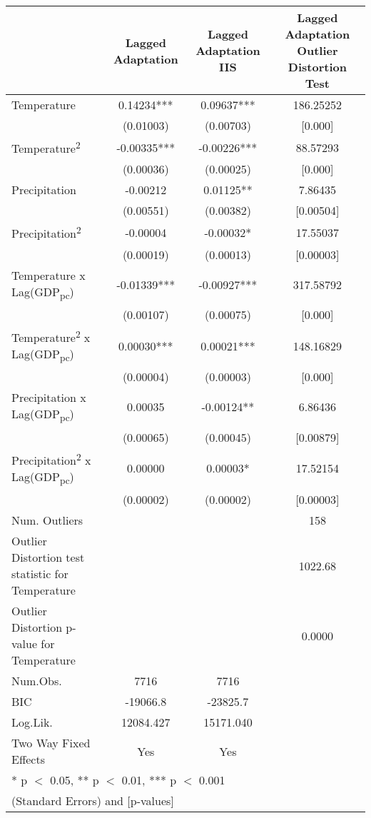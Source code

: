 \begin{table}
\centering
\begin{tabular}[t]{lccc}
\toprule
  & Lagged Adaptation & Lagged Adaptation IIS & Lagged Adaptation Outlier Distortion Test\\
\midrule
Temperature & 0.14234*** & 0.09637*** & 186.25252\\
 & (0.01003) & (0.00703) & [0.000]\\
Temperature\textsuperscript{2} & -0.00335*** & -0.00226*** & 88.57293\\
 & (0.00036) & (0.00025) & [0.000]\\
Precipitation & -0.00212 & 0.01125** & 7.86435\\
 & (0.00551) & (0.00382) & [0.00504]\\
Precipitation\textsuperscript{2} & -0.00004 & -0.00032* & 17.55037\\
 & (0.00019) & (0.00013) & [0.00003]\\
Temperature x Lag(GDP\textsubscript{pc}) & -0.01339*** & -0.00927*** & 317.58792\\
 & (0.00107) & (0.00075) & [0.000]\\
Temperature\textsuperscript{2} x Lag(GDP\textsubscript{pc}) & 0.00030*** & 0.00021*** & 148.16829\\
 & (0.00004) & (0.00003) & [0.000]\\
Precipitation x Lag(GDP\textsubscript{pc}) & 0.00035 & -0.00124** & 6.86436\\
 & (0.00065) & (0.00045) & [0.00879]\\
Precipitation\textsuperscript{2} x Lag(GDP\textsubscript{pc}) & 0.00000 & 0.00003* & 17.52154\\
 & (0.00002) & (0.00002) & [0.00003]\\
\midrule
Num. Outliers &  &  & 158\\
Outlier Distortion test statistic for Temperature &  &  & 1022.68\\
Outlier Distortion p-value for Temperature &  &  & 0.0000\\
Num.Obs. & 7716 & 7716 & \\
BIC & -19066.8 & -23825.7 & \\
Log.Lik. & 12084.427 & 15171.040 & \\
Two Way Fixed Effects & Yes & Yes & \\
\bottomrule
\multicolumn{4}{l}{\textsuperscript{} * p $<$ 0.05, ** p $<$ 0.01, *** p $<$ 0.001}\\
\multicolumn{4}{l}{\textsuperscript{} (Standard Errors) and [p-values]}\\
\end{tabular}
\end{table}

